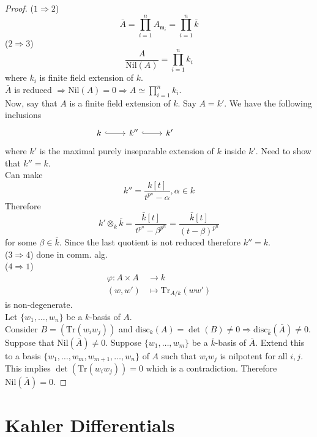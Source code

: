 \documentclass[oneside, 12pt]{scrbook}
\newcommand{\m}{\mathfrak{m}}
\newcommand{\nil}{\mathrm{Nil}}
\newcommand{\ds}{\displaystyle}
\theoremstyle{theorem}
\begin{document}
\begin{proof}
($1 \Rightarrow 2$)
$$ \bar{A} = \prod_{i=1}^{n} A_{\m_{i}} = \prod_{i=1}^n \bar{k}$$
($2 \Rightarrow 3$) 
$$\frac{A}{\mathrm{Nil}(A)} = \prod_{i=1}^{n} k_{i}$$ where $k_{i}$ is finite field extension of $k$. \\
$\bar{A}$ is reduced $\Rightarrow \nil(A)=0 \Rightarrow A \simeq \ds{\prod_{i=1}^n k_{i}}$. \\
Now, say that $A$ is a finite field extension of $k$. Say $A = k'$. We have the following inclusions \[\begin{tikzcd}
	k & {k''} & {k'} && {}
	\arrow[hook, from=1-1, to=1-2]
	\arrow[hook, from=1-2, to=1-3]
\end{tikzcd}\]
where $k'$ is the maximal purely inseparable extension of $k$ inside $k'$. Need to show that $k'' = k$. \\
Can make $$k '' = \frac{k[t]}{t^{p^n} - \alpha} , \alpha \in k$$
Therefore $$k ' \otimes_{k} \bar{k} = \frac{\bar{k}[t]}{t^{p^n} - \beta^{p^{n}}} = \frac{\bar{k}[t]}{(t-\beta)^{p^n}}$$ for some $\beta\in \bar{k}$. Since the last quotient is not reduced therefore $k'' =k$.\\

($3 \Rightarrow 4$) done in comm. alg. \\

($4 \Rightarrow 1$)
\begin{align*}
\varphi : A\times A &\rightarrow k \\
(w,w') &\mapsto \mathrm{Tr}_{A/k}(ww')
\end{align*}
is non-degenerate. \\
Let $\{w_{1}, \hdots , w_{n}\}$ be a $k$-basis of $A$. \\
Consider $B = (\mathrm{Tr}(w_{i}w_{j}))$ and $\mathrm{disc}_{k}(A) = \det(B) \neq 0 \Rightarrow \mathrm{disc}_{\bar{k}}(\bar{A}) \neq 0$. \\
Suppose that $\nil(\bar{A}) \neq 0$. Suppose $\{w_{1}, \hdots , w_{m}\}$ be a $\bar{k}$-basis of $\bar{A}$. Extend this to a basis $\{w_{1}, \hdots , w_{m}, w_{m+1}, \hdots , w_{n}\}$ of $A$ such that $w_{i}w_{j}$ is nilpotent for all $i,j$. This implies $\det(\mathrm{Tr}(w_{i}w_{j})) = 0$ which is a contradiction. Therefore $\nil(\bar{A})=0$.
\end{proof}

\section{Kahler Differentials}
\end{document}
